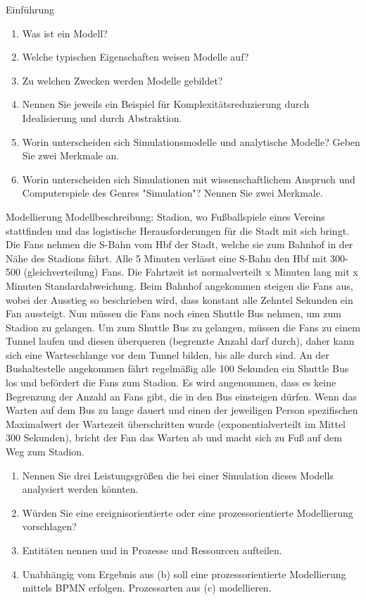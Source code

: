 \documentclass{article}
\author{Leopold Lemmermann}
\begin{document}
\createtitle

\begin{exercise}{Einführung}
  \begin{enumerate}
    \item Was ist ein Modell?
    \item Welche typischen Eigenschaften weisen Modelle auf?
    \item Zu welchen Zwecken werden Modelle gebildet?
    \item Nennen Sie jeweils ein Beispiel für Komplexitätsreduzierung durch Idealisierung und durch Abstraktion.
    \item Worin unterscheiden sich Simulationsmodelle und analytische Modelle? Geben Sie zwei Merkmale an.
    \item Worin unterscheiden sich Simulationen mit wissenschaftlichem Anspruch und Computerspiele des Genres "Simulation"? Nennen Sie zwei Merkmale.
  \end{enumerate}
\end{exercise}

\begin{exercise}{Modellierung}
  Modellbeschreibung: Stadion, wo Fußballspiele eines Vereins stattfinden und das logistische Herausforderungen für die Stadt mit sich bringt. Die Fans nehmen die S-Bahn vom Hbf der Stadt, welche sie zum Bahnhof in der Nähe des Stadions fährt. Alle 5 Minuten verlässt eine S-Bahn den Hbf mit 300-500 (gleichverteilung) Fans. Die Fahrtzeit ist normalverteilt x Minuten lang mit x Minuten Standardabweichung. Beim Bahnhof angekommen steigen die Fans aus, wobei der Ausstieg so beschrieben wird, dass konstant alle Zehntel Sekunden ein Fan aussteigt. Nun müssen die Fans noch einen Shuttle Bus nehmen, um zum Stadion zu gelangen. Um zum Shuttle Bus zu gelangen, müssen die Fans zu einem Tunnel laufen und diesen überqueren (begrenzte Anzahl darf durch), daher kann sich eine Warteschlange vor dem Tunnel bilden, bis alle durch sind. An der Bushaltestelle angekommen fährt regelmäßig alle 100 Sekunden ein Shuttle Bus los und befördert die Fans zum Stadion. Es wird angenommen, dass es keine Begrenzung der Anzahl an Fans gibt, die in den Bus einsteigen dürfen. Wenn das Warten auf dem Bus zu lange dauert und einen der jeweiligen Person spezifischen Maximalwert der Wartezeit überschritten wurde (exponentialverteilt im Mittel 300 Sekunden), bricht der Fan das Warten ab und macht sich zu Fuß auf dem Weg zum Stadion.
  \begin{enumerate}
    \item Nennen Sie drei Leistungsgrößen die bei einer Simulation dieses Modells analysiert werden könnten.
    \item Würden Sie eine ereignisorientierte oder eine prozessorientierte Modellierung vorschlagen?
    \item Entitäten nennen und in Prozesse und Ressourcen aufteilen.
    \item Unabhängig vom Ergebnis aus (b) soll eine prozessorientierte Modellierung mittels BPMN erfolgen. Prozessarten aus (c) modellieren.
  \end{enumerate}
\end{exercise}
\end{document}
